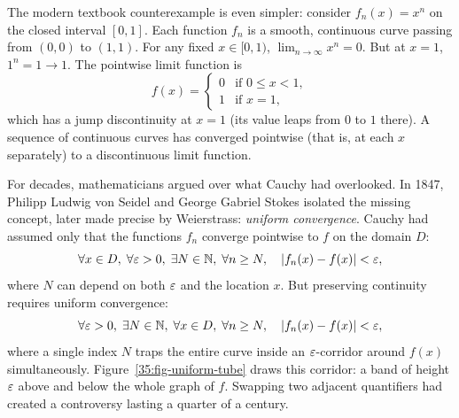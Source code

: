 \begin{itemize}
  The modern textbook counterexample is even simpler: consider $f_n(x) = x^n$ on the closed interval $[0, 1]$. Each function $f_n$ is a smooth, continuous curve passing from $(0, 0)$ to $(1, 1)$. For any fixed $x \in [0, 1)$, $\lim_{n \to \infty} x^n = 0$. But at $x = 1$, $1^n = 1 \to 1$. The pointwise limit function is
  \[
  f(x) = \begin{cases} 0 & \text{if } 0 \le x < 1, \\ 1 & \text{if } x = 1, \end{cases}
  \]
  which has a jump discontinuity at $x = 1$ (its value leaps from $0$ to $1$ there). A sequence of continuous curves has converged pointwise (that is, at each $x$ separately) to a discontinuous limit function.
  
  For decades, mathematicians argued over what Cauchy had overlooked. In 1847, Philipp Ludwig von Seidel and George Gabriel Stokes isolated the missing concept, later made precise by Weierstrass: \emph{uniform convergence}. Cauchy had assumed only that the functions $f_n$ converge pointwise to $f$ on the domain $D$:
  \[
  \forall x \in D, \; \forall \varepsilon > 0, \; \exists N \in \mathbb{N}, \; \forall n \ge N, \quad |f_n(x) - f(x)| < \varepsilon,
  \]
  where $N$ can depend on both $\varepsilon$ and the location $x$. But preserving continuity requires uniform convergence:
  \[
  \forall \varepsilon > 0, \; \exists N \in \mathbb{N}, \; \forall x \in D, \; \forall n \ge N, \quad |f_n(x) - f(x)| < \varepsilon,
  \]
  where a single index $N$ traps the entire curve inside an $\varepsilon$-corridor around $f(x)$ simultaneously. Figure~\ref{35:fig-uniform-tube} draws this corridor: a band of height $\varepsilon$ above and below the whole graph of $f$. Swapping two adjacent quantifiers had created a controversy lasting a quarter of a century.


\end{itemize}
